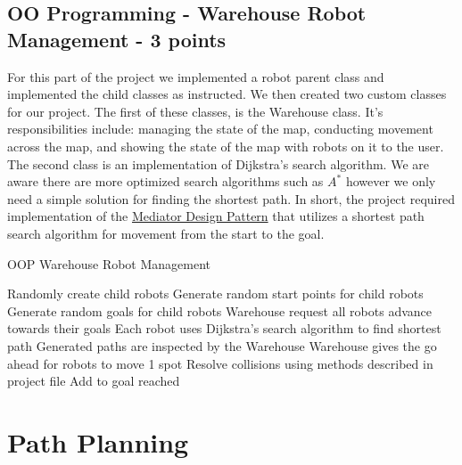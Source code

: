 \documentclass{article}
\numberwithin{equation}{section} %
\numberwithin{figure}{section} %
\numberwithin{table}{section} %
\begin{document}
\begin{framed}
\subsection{ OO Programming - Warehouse Robot Management - 3 points}
\label{sec:OOO}

For this part of the project we implemented a robot parent class and implemented the child classes as instructed.  We then created two custom classes for our project.  The first of these classes, is the Warehouse class.  It's responsibilities include: managing the state of the map, conducting movement across the map, and showing the state of the map with robots on it to the user.  The second class is an implementation of Dijkstra's search algorithm.  We are aware there are more optimized search algorithms such as $A^*$ however we only need a simple solution for finding the shortest path.  In short, the project required implementation of the \href{https://refactoring.guru/design-patterns/mediator}{Mediator Design Pattern} that utilizes a shortest path search algorithm for movement from the start to the goal.

\begin{algorithm}[H]
\caption{OOP Warehouse Robot Management }\label{alg:cap}
\begin{algorithmic}[1] %
\State Randomly create child robots
\State Generate random start points for child robots
\State Generate random goals for child robots
\State Warehouse request all robots advance towards their goals
\State Each robot uses Dijkstra's search algorithm to find shortest path
\State Generated paths are inspected by the Warehouse
  \State Warehouse gives the go ahead for robots to move 1 spot
\Else
  \State Resolve collisions using methods described in project file
\EndIf
{}
\State Add to goal reached 
\EndIf
\EndWhile
\end{algorithmic}
\end{algorithm}



\end{framed}


\section{Path Planning}
\end{document}
